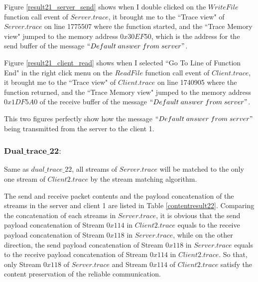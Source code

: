 Figure \ref{result21_server_send} shows when I double clicked on the $WriteFile$ function call event of $Server.trace$, it brought me to the ``Trace view" of $Server.trace$ on line 1775507 where the function started, and the ``Trace Memory view" jumped to the memory address $0x30EF50$, which is the address for the send buffer of the message $``Default\; answer\; from\; server"$.

Figure \ref{result21_client_read} shows when I selected ``Go To Line of Function End" in the right click menu on the $ReadFile$ function call event of $Client.trace$, it brought me to the ``Trace view" of $Client.trace$ on line 1740905 where the function returned, and the ``Trace Memory view" jumped to the memory address $0x1DF5A0$ of the receive buffer of the message $``Default\; answer\; from\; server"$.

This two figures perfectly show how the message $``Default\; answer\; from\; server"$ being transmitted from the server to the client 1.

\subsubsection{$\boldsymbol{Dual\_trace\_22:}$}
Same as $dual\_trace\_22$, all streams of $Server.trace$ will be matched to the only one stream of $Client2.trace$ by the stream matching algorithm.

The send and receive packet contents and the payload concatenation of the streams in the server and client 1 are listed in Table \ref{contentresult22}. Comparing the concatenation of each streams in $Server.trace$, it is obvious that the send payload concatenation of Stream $0x114$ in $Client2.trace$ equals to the receive payload concatenation of Stream $0x118$ in $Server.trace$, while on the other direction, the send payload concatenation of Stream $0x118$ in $Server.trace$ equals to the receive payload concatenation of Stream $0x114$ in $Client2.trace$. So that, only Stream $0x118$ of $Server.trace$ and Stream $0x114$ of $Client2.trace$ satisfy the content preservation of the reliable communication. 

